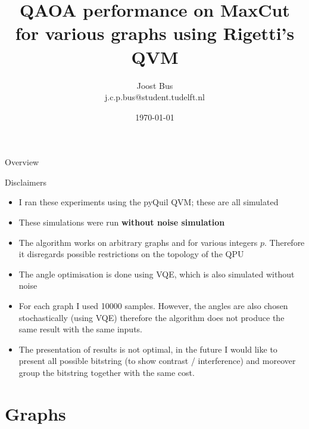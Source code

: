 \documentclass{beamer}
\title[]{QAOA performance on MaxCut \\ for various graphs using Rigetti's QVM}
\institute[]{Technische Universiteit Delft, Nederland}
\author{Joost Bus \\ \tiny{j.c.p.bus@student.tudelft.nl}}
\date{\today}
\begin{document}
{
\frame{\titlepage}
}
{}

\begin{frame}{Overview}
\tableofcontents
\end{frame}

\begin{frame}{Disclaimers}
	\begin{itemize}
		\item I ran these experiments using the pyQuil QVM; these are all simulated
		\item These simulations were run \textbf{without noise simulation}
		\item The algorithm works on arbitrary graphs and for various integers $p$. Therefore it disregards possible restrictions on the topology of the QPU
		\item The angle optimisation is done using VQE, which is also simulated without noise
		\item For each graph I used 10000 samples. However, the angles are also chosen stochastically (using VQE) therefore the algorithm does not produce the same result with the same inputs.
		\item The presentation of results is not optimal, in the future I would like to present all possible bitstring (to show contrast / interference) and moreover group the bitstring together with the same cost.
	\end{itemize}
\end{frame}

\section{Graphs}
\end{document}
